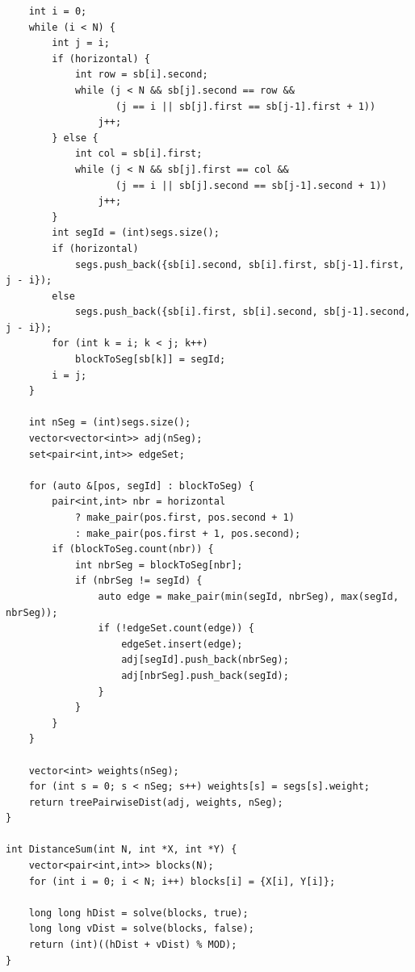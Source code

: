 \documentclass[11pt,a4paper]{article}
\begin{document}
\begin{lstlisting}
    int i = 0;
    while (i < N) {
        int j = i;
        if (horizontal) {
            int row = sb[i].second;
            while (j < N && sb[j].second == row &&
                   (j == i || sb[j].first == sb[j-1].first + 1))
                j++;
        } else {
            int col = sb[i].first;
            while (j < N && sb[j].first == col &&
                   (j == i || sb[j].second == sb[j-1].second + 1))
                j++;
        }
        int segId = (int)segs.size();
        if (horizontal)
            segs.push_back({sb[i].second, sb[i].first, sb[j-1].first, j - i});
        else
            segs.push_back({sb[i].first, sb[i].second, sb[j-1].second, j - i});
        for (int k = i; k < j; k++)
            blockToSeg[sb[k]] = segId;
        i = j;
    }

    int nSeg = (int)segs.size();
    vector<vector<int>> adj(nSeg);
    set<pair<int,int>> edgeSet;

    for (auto &[pos, segId] : blockToSeg) {
        pair<int,int> nbr = horizontal
            ? make_pair(pos.first, pos.second + 1)
            : make_pair(pos.first + 1, pos.second);
        if (blockToSeg.count(nbr)) {
            int nbrSeg = blockToSeg[nbr];
            if (nbrSeg != segId) {
                auto edge = make_pair(min(segId, nbrSeg), max(segId, nbrSeg));
                if (!edgeSet.count(edge)) {
                    edgeSet.insert(edge);
                    adj[segId].push_back(nbrSeg);
                    adj[nbrSeg].push_back(segId);
                }
            }
        }
    }

    vector<int> weights(nSeg);
    for (int s = 0; s < nSeg; s++) weights[s] = segs[s].weight;
    return treePairwiseDist(adj, weights, nSeg);
}

int DistanceSum(int N, int *X, int *Y) {
    vector<pair<int,int>> blocks(N);
    for (int i = 0; i < N; i++) blocks[i] = {X[i], Y[i]};

    long long hDist = solve(blocks, true);
    long long vDist = solve(blocks, false);
    return (int)((hDist + vDist) % MOD);
}
\end{lstlisting}
\end{document}
